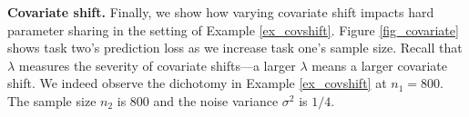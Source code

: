 \textbf{Covariate shift.}
Finally, we show how varying covariate shift impacts hard parameter sharing in the setting of Example \ref{ex_covshift}. 
Figure \ref{fig_covariate} shows task two's prediction loss as we increase task one's sample size.
Recall that $\lambda$ measures the severity of covariate shifts---a larger $\lambda$ means a larger covariate shift.
We indeed observe the dichotomy in Example \ref{ex_covshift} at $n_1 = 800$.
The sample size $n_2$ is $800$ and the noise variance $\sigma^2$ is $1/4$.



